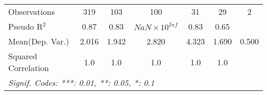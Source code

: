 \begin{tabular}{lcccccc}
   Observations                                               & 319      & 103           & 100                   & 31           & 29      & 2\\  
   Pseudo R$^2$                                               & 0.87     & 0.83          & $NaN\times 10^{Inf}$  & 0.83         & 0.65    & \\  
Mean(Dep. Var.) & 2.016 & 1.942 & 2.820 & 4.323 & 1.690 & 0.500 \\
   Squared Correlation                                        & 1.0      & 1.0           & 1.0                   & 1.0          & 1.0     & \\  
   \midrule \midrule
   \multicolumn{7}{l}{\emph{Signif. Codes: ***: 0.01, **: 0.05, *: 0.1}}\\
\end{tabular}
\par\endgroup
